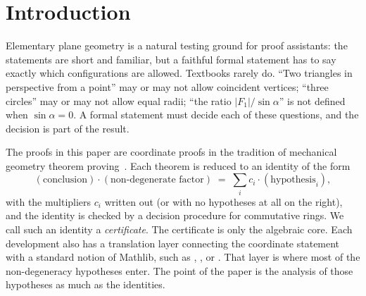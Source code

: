 \documentclass[11pt]{article}
\theoremstyle{definition}
\theoremstyle{remark}
\begin{document}
\section{Introduction}

Elementary plane geometry is a natural testing ground for proof assistants: the statements are
short and familiar, but a faithful formal statement has to say exactly which configurations are
allowed. Textbooks rarely do. ``Two triangles in perspective from a point'' may or may not
allow coincident vertices; ``three circles'' may or may not allow equal radii; ``the ratio
$|F_1|/\sin\alpha$'' is not defined when $\sin\alpha=0$. A formal statement must decide each of
these questions, and the decision is part of the result.

The proofs in this paper are coordinate proofs in the tradition of mechanical geometry theorem
proving~\cite{Chou}. Each theorem is reduced to an identity of the form
\[
  (\text{conclusion})\cdot(\text{non-degenerate factor}) \;=\; \sum_i c_i\cdot(\text{hypothesis}_i),
\]
with the multipliers $c_i$ written out (or with no hypotheses at all on the right), and the
identity is checked by a decision procedure for commutative rings. We call such an identity a
\emph{certificate}. The certificate is only the algebraic core. Each development also has a
translation layer connecting the coordinate statement with a standard notion of Mathlib, such as
, ,  or
. That layer is where most of the non-degeneracy hypotheses enter. The
point of the paper is the analysis of those hypotheses as much as the identities.
\end{document}
